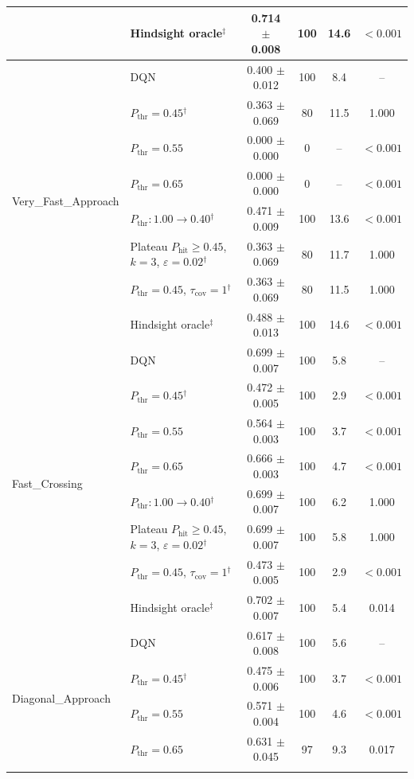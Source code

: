 \begin{table}[htbp]
\begin{tabular}{llcccc}
 & Hindsight oracle$^{\ddagger}$ & 0.714 $\pm$ 0.008 & 100 & 14.6 & $<0.001$ \\
\midrule
\multirow{8}{*}{Very\_Fast\_Approach} & DQN & 0.400 $\pm$ 0.012 & 100 & 8.4 & -- \\
 & $P_{\mathrm{thr}}=0.45$$^{\dagger}$ & 0.363 $\pm$ 0.069 & 80 & 11.5 & 1.000 \\
 & $P_{\mathrm{thr}}=0.55$ & 0.000 $\pm$ 0.000 & 0 & -- & $<0.001$ \\
 & $P_{\mathrm{thr}}=0.65$ & 0.000 $\pm$ 0.000 & 0 & -- & $<0.001$ \\
 & $P_{\mathrm{thr}}: 1.00 \to 0.40$$^{\dagger}$ & 0.471 $\pm$ 0.009 & 100 & 13.6 & $<0.001$ \\
 & Plateau $P_{\mathrm{hit}}\geq0.45$, $k=3$, $\varepsilon=0.02$$^{\dagger}$ & 0.363 $\pm$ 0.069 & 80 & 11.7 & 1.000 \\
 & $P_{\mathrm{thr}}=0.45$, $\tau_{\mathrm{cov}}=1$$^{\dagger}$ & 0.363 $\pm$ 0.069 & 80 & 11.5 & 1.000 \\
 & Hindsight oracle$^{\ddagger}$ & 0.488 $\pm$ 0.013 & 100 & 14.6 & $<0.001$ \\
\midrule
\multirow{8}{*}{Fast\_Crossing} & DQN & 0.699 $\pm$ 0.007 & 100 & 5.8 & -- \\
 & $P_{\mathrm{thr}}=0.45$$^{\dagger}$ & 0.472 $\pm$ 0.005 & 100 & 2.9 & $<0.001$ \\
 & $P_{\mathrm{thr}}=0.55$ & 0.564 $\pm$ 0.003 & 100 & 3.7 & $<0.001$ \\
 & $P_{\mathrm{thr}}=0.65$ & 0.666 $\pm$ 0.003 & 100 & 4.7 & $<0.001$ \\
 & $P_{\mathrm{thr}}: 1.00 \to 0.40$$^{\dagger}$ & 0.699 $\pm$ 0.007 & 100 & 6.2 & 1.000 \\
 & Plateau $P_{\mathrm{hit}}\geq0.45$, $k=3$, $\varepsilon=0.02$$^{\dagger}$ & 0.699 $\pm$ 0.007 & 100 & 5.8 & 1.000 \\
 & $P_{\mathrm{thr}}=0.45$, $\tau_{\mathrm{cov}}=1$$^{\dagger}$ & 0.473 $\pm$ 0.005 & 100 & 2.9 & $<0.001$ \\
 & Hindsight oracle$^{\ddagger}$ & 0.702 $\pm$ 0.007 & 100 & 5.4 & 0.014 \\
\midrule
\multirow{8}{*}{Diagonal\_Approach} & DQN & 0.617 $\pm$ 0.008 & 100 & 5.6 & -- \\
 & $P_{\mathrm{thr}}=0.45$$^{\dagger}$ & 0.475 $\pm$ 0.006 & 100 & 3.7 & $<0.001$ \\
 & $P_{\mathrm{thr}}=0.55$ & 0.571 $\pm$ 0.004 & 100 & 4.6 & $<0.001$ \\
 & $P_{\mathrm{thr}}=0.65$ & 0.631 $\pm$ 0.045 & 97 & 9.3 & 0.017 \\
$$
\end{tabular}
\end{table}
